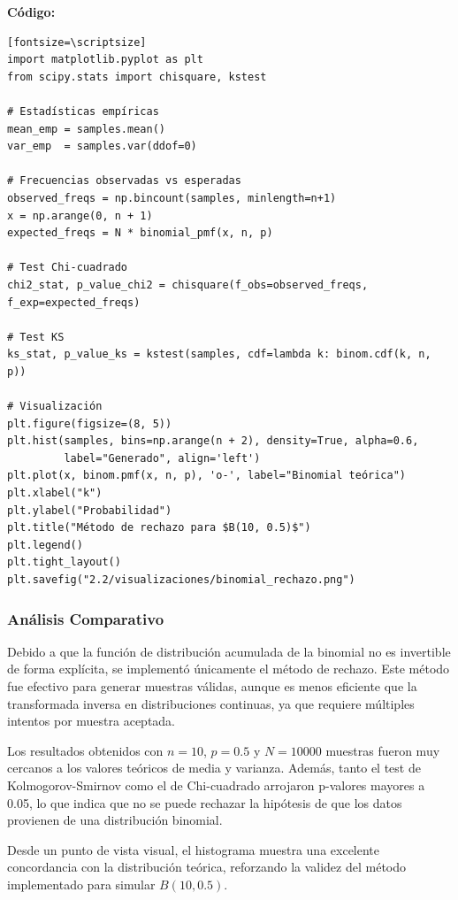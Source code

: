 \documentclass{article}
\begin{document}
\textbf{Código:}
\begin{verbatim}[fontsize=\scriptsize]
import matplotlib.pyplot as plt
from scipy.stats import chisquare, kstest

# Estadísticas empíricas
mean_emp = samples.mean()
var_emp  = samples.var(ddof=0)

# Frecuencias observadas vs esperadas
observed_freqs = np.bincount(samples, minlength=n+1)
x = np.arange(0, n + 1)
expected_freqs = N * binomial_pmf(x, n, p)

# Test Chi-cuadrado
chi2_stat, p_value_chi2 = chisquare(f_obs=observed_freqs, f_exp=expected_freqs)

# Test KS
ks_stat, p_value_ks = kstest(samples, cdf=lambda k: binom.cdf(k, n, p))

# Visualización
plt.figure(figsize=(8, 5))
plt.hist(samples, bins=np.arange(n + 2), density=True, alpha=0.6,
         label="Generado", align='left')
plt.plot(x, binom.pmf(x, n, p), 'o-', label="Binomial teórica")
plt.xlabel("k")
plt.ylabel("Probabilidad")
plt.title("Método de rechazo para $B(10, 0.5)$")
plt.legend()
plt.tight_layout()
plt.savefig("2.2/visualizaciones/binomial_rechazo.png")
\end{verbatim}

\vspace{0.5em}
\subsubsection{Análisis Comparativo}
Debido a que la función de distribución acumulada de la binomial no es invertible de forma explícita, se implementó únicamente el método de rechazo. Este método fue efectivo para generar muestras válidas, aunque es menos eficiente que la transformada inversa en distribuciones continuas, ya que requiere múltiples intentos por muestra aceptada.

Los resultados obtenidos con $n=10$, $p=0.5$ y $N=10000$ muestras fueron muy cercanos a los valores teóricos de media y varianza. Además, tanto el test de Kolmogorov-Smirnov como el de Chi-cuadrado arrojaron p-valores mayores a 0.05, lo que indica que no se puede rechazar la hipótesis de que los datos provienen de una distribución binomial.

Desde un punto de vista visual, el histograma muestra una excelente concordancia con la distribución teórica, reforzando la validez del método implementado para simular $B(10, 0.5)$.
\end{document}
